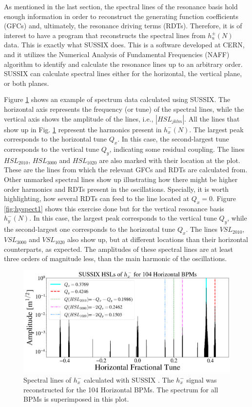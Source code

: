 As mentioned in the last section, the spectral lines of the resonance basis hold enough information in order to reconstruct the generating function coefficients (GFCs) and, ultimately, the resonance driving terms (RDTs). Therefore, it is of interest to have a program that reconstructs the spectral lines from $h_u^{\pm}(N)$ data. This is exactly what SUSSIX \cite{sussix} does. This is a software developed at CERN, and it utilizes the Numerical Analysis of Fundamental Frequencies (NAFF) algorithm to identify and calculate the resonance lines up to an arbitrary order. SUSSIX can calculate spectral lines either for the horizontal, the vertical plane, or both planes.   

Figure \ref{fig:hxspect1} shows an example of spectrum data calculated using SUSSIX. The horizontal axis represents the frequency (or tune) of the spectral lines, while the vertical axis shows the amplitude of the lines, i.e., $|HSL_{jklm}|$. All the lines that show up in Fig. \ref{fig:hxspect1} represent the harmonics present in $h_x^{-}(N)$. The largest peak corresponds to the horizontal tune $Q_x$. In this case, the second-largest tune corresponds to the vertical tune $Q_y$, indicating some residual coupling. The lines $HSL_{2010}$, $HSL_{3000}$ and $HSL_{1020}$ are also marked with their location at the plot. These are the lines from which the relevant GFCs and RDTs are calculated from. Other unmarked spectral lines show up illustrating how there might be higher order harmonics and RDTs present in the oscillations. Specially, it is worth highlighting, how several RDTs can feed to the line located at $Q_x=0$. Figure \ref{fig:hyspect1} shows this exercise done but for the vertical resonance basis $h_y^{-}(N)$. In this case, the largest peak corresponds to the vertical tune $Q_y$, while the second-largest one corresponds to the horizontal tune $Q_x$. The lines $VSL_{2010}$, $VSL_{3000}$ and $VSL_{1020}$ also show up, but at different locations than their horizontal counterparts, as expected. The amplitudes of these spectral lines are at least three orders of magnitude less, than the main harmonic of the oscillations.  

\begin{figure}[H]
    \centering
    \includegraphics[width=\columnwidth]{chapter4/hxspect.png}
    \caption{Spectral lines of $h_x^{-}$ calculated with SUSSIX \cite{sussix}. The $h_x^{-}$ signal was reconstructed for the 104 Horizontal BPMs. The spectrum for all BPMs is superimposed in this plot.}
    \label{fig:hxspect1}
\end{figure}

